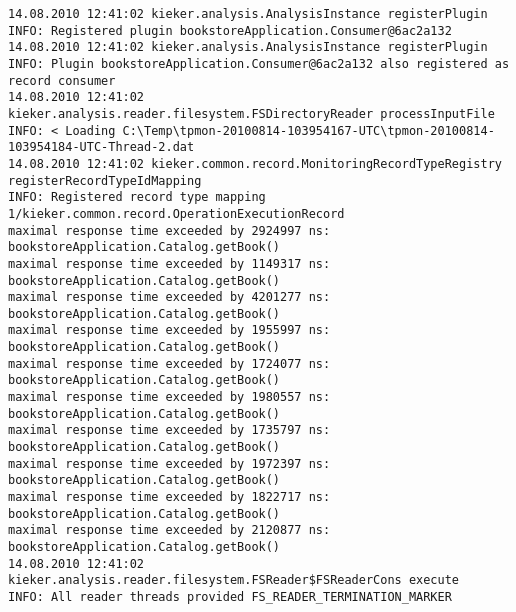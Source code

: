 \setBashListing
\begin{lstlisting}
14.08.2010 12:41:02 kieker.analysis.AnalysisInstance registerPlugin
INFO: Registered plugin bookstoreApplication.Consumer@6ac2a132
14.08.2010 12:41:02 kieker.analysis.AnalysisInstance registerPlugin
INFO: Plugin bookstoreApplication.Consumer@6ac2a132 also registered as record consumer
14.08.2010 12:41:02 kieker.analysis.reader.filesystem.FSDirectoryReader processInputFile
INFO: < Loading C:\Temp\tpmon-20100814-103954167-UTC\tpmon-20100814-103954184-UTC-Thread-2.dat
14.08.2010 12:41:02 kieker.common.record.MonitoringRecordTypeRegistry registerRecordTypeIdMapping
INFO: Registered record type mapping 1/kieker.common.record.OperationExecutionRecord
maximal response time exceeded by 2924997 ns: bookstoreApplication.Catalog.getBook()
maximal response time exceeded by 1149317 ns: bookstoreApplication.Catalog.getBook()
maximal response time exceeded by 4201277 ns: bookstoreApplication.Catalog.getBook()
maximal response time exceeded by 1955997 ns: bookstoreApplication.Catalog.getBook()
maximal response time exceeded by 1724077 ns: bookstoreApplication.Catalog.getBook()
maximal response time exceeded by 1980557 ns: bookstoreApplication.Catalog.getBook()
maximal response time exceeded by 1735797 ns: bookstoreApplication.Catalog.getBook()
maximal response time exceeded by 1972397 ns: bookstoreApplication.Catalog.getBook()
maximal response time exceeded by 1822717 ns: bookstoreApplication.Catalog.getBook()
maximal response time exceeded by 2120877 ns: bookstoreApplication.Catalog.getBook()
14.08.2010 12:41:02 kieker.analysis.reader.filesystem.FSReader$FSReaderCons execute
INFO: All reader threads provided FS_READER_TERMINATION_MARKER
\end{lstlisting}